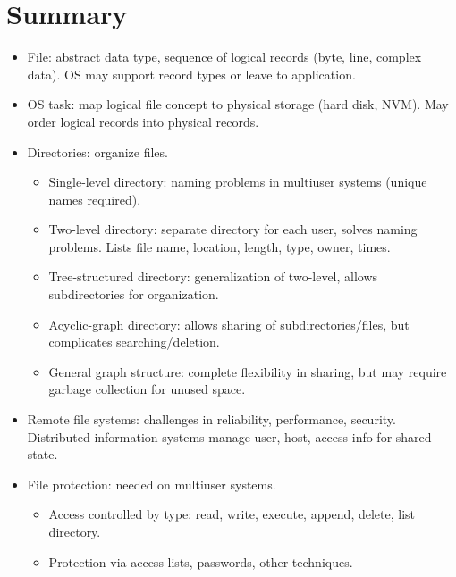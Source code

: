 \section{Summary}

\begin{itemize}
    \item File: abstract data type, sequence of logical records (byte, line, complex data). OS may support record types or leave to application.
    \item OS task: map logical file concept to physical storage (hard disk, NVM). May order logical records into physical records.
    \item Directories: organize files.
    \begin{itemize}
        \item Single-level directory: naming problems in multiuser systems (unique names required).
        \item Two-level directory: separate directory for each user, solves naming problems. Lists file name, location, length, type, owner, times.
        \item Tree-structured directory: generalization of two-level, allows subdirectories for organization.
        \item Acyclic-graph directory: allows sharing of subdirectories/files, but complicates searching/deletion.
        \item General graph structure: complete flexibility in sharing, but may require garbage collection for unused space.
    \end{itemize}
    \item Remote file systems: challenges in reliability, performance, security. Distributed information systems manage user, host, access info for shared state.
    \item File protection: needed on multiuser systems.
    \begin{itemize}
        \item Access controlled by type: read, write, execute, append, delete, list directory.
        \item Protection via access lists, passwords, other techniques.
    \end{itemize}
\end{itemize}
